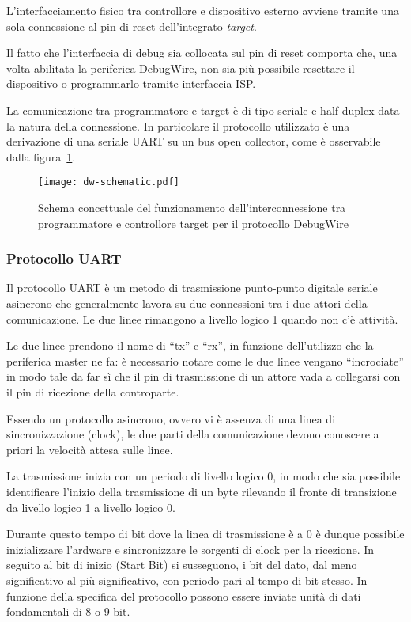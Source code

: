 L'interfacciamento fisico tra controllore e dispositivo esterno avviene tramite una sola connessione al pin di reset dell'integrato \textit{target}.

Il fatto che l'interfaccia di debug sia collocata sul pin di reset comporta che, una volta abilitata la periferica DebugWire, non sia più possibile resettare il dispositivo o programmarlo tramite interfaccia ISP\cite{avr:appnote:isp}\cite{avr:m328p}.

La comunicazione tra programmatore e target è di tipo seriale e half duplex data la natura della connessione. In particolare il protocollo utilizzato è una derivazione di una seriale UART su un bus open collector, come è osservabile dalla figura~\ref{fig:dw-schematic}\cite{site:dw-reverse-engeneering}.

\begin{figure}[t]
    \centering
    \texttt{[image: dw-schematic.pdf]}
    \caption[]{Schema concettuale del funzionamento dell'interconnessione tra programmatore e controllore target per il protocollo DebugWire}\label{fig:dw-schematic}
\end{figure}

\subsubsection{Protocollo UART}

Il protocollo UART è un metodo di trasmissione punto-punto digitale seriale asincrono che generalmente lavora su due connessioni tra i due attori della comunicazione. Le due linee rimangono a livello logico 1 quando non c'è attività.

Le due linee prendono il nome di ``tx'' e ``rx'', in funzione dell'utilizzo che la periferica master ne fa: è necessario notare come le due linee vengano ``incrociate'' in modo tale da far sì che il pin di trasmissione di un attore vada a collegarsi con il pin di ricezione della controparte.

Essendo un protocollo asincrono, ovvero vi è assenza di una linea di sincronizzazione (clock), le due parti della comunicazione devono conoscere a priori la velocità attesa sulle linee.

La trasmissione inizia con un periodo di livello logico 0, in modo che sia possibile identificare l'inizio della trasmissione di un byte rilevando il fronte di transizione da livello logico 1 a livello logico 0.

Durante questo tempo di bit dove la linea di trasmissione è a 0 è dunque possibile inizializzare l'ardware e sincronizzare le sorgenti di clock per la ricezione. In seguito al bit di inizio (Start Bit) si susseguono, i bit del dato, dal meno significativo al più significativo, con periodo pari al tempo di bit stesso. In funzione della specifica del protocollo possono essere inviate unità di dati fondamentali di 8 o 9 bit.
 
